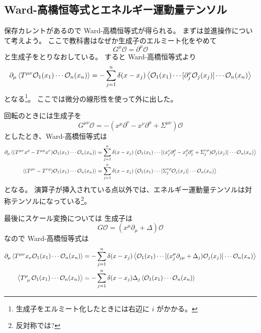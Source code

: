 \documentclass[../../master.tex]{subfiles}
\begin{document}
\subsection*{Ward-高橋恒等式とエネルギー運動量テンソル}
保存カレントがあるので Ward-高橋恒等式が得られる。
まずは並進操作について考えよう。
ここで教科書はなぜか生成子のエルミート化をやめて
\begin{equation}
    G^\mu \mathcal{O} = \partial^\mu \mathcal{O}
\end{equation}
と生成子をとりなおしている。
すると Ward-高橋恒等式より
\begin{equation}
    \partial_\mu\ev{T^{\mu\nu}\mathcal{O}_1(x_1)\cdots\mathcal{O}_n(x_n)}
    = - \sum_{j=1}^n \delta(x-x_j)\ev{\mathcal{O}_1(x_1)\cdots[\partial_j^\nu\mathcal{O}_j(x_j)]\cdots\mathcal{O}_n(x_n)}
\end{equation}
となる\footnote{生成子をエルミート化したときには右辺に \(i\) がかかる。}。
ここでは微分の線形性を使って外に出した。

回転のときには生成子を
\begin{equation}
    G^{\mu\nu}\mathcal{O} = -(x^\mu\partial^\nu-x^\nu\partial^\mu + \Sigma^{\mu\nu})\mathcal{O}
\end{equation}
としたとき、Ward-高橋恒等式は
\begin{align}
    \partial_\mu\ev{(T^{\mu\nu}x^\rho - T^{\mu\rho}x^\nu)\mathcal{O}_1(x_1)\cdots\mathcal{O}_n(x_n)}
    &= \sum_{j=1}^n \delta(x-x_j)\ev{
        \mathcal{O}_1(x_1)\cdots [
            (x_j^\nu\partial_j^\rho-x_j^\rho\partial_j^\nu + \Sigma_j^{\nu\rho})\mathcal{O}_j(x_j)
        ]\cdots\mathcal{O}_n(x_n)}\\
    \ev{(T^{\rho\nu} - T^{\nu\rho})\mathcal{O}_1(x_1)\cdots\mathcal{O}_n(x_n)}
    &= \sum_{j=1}^n \delta(x-x_j)\ev{
        \mathcal{O}_1(x_1)\cdots [
            \Sigma_j^{\nu\rho}\mathcal{O}_j(x_j)
        ]\cdots\mathcal{O}_n(x_n)}
\end{align}
となる。 %
演算子が挿入されている点以外では、エネルギー運動量テンソルは対称テンソルになっている\footnote{反対称では?}。

最後にスケール変換については
生成子は
\begin{equation}
    G\mathcal{O} = (x^\mu\partial_\mu + \Delta)\mathcal{O}
\end{equation}
なので Ward-高橋恒等式は
\begin{align}
    \partial_\mu\ev{T^{\mu\nu}x_\nu \mathcal{O}_1(x_1)\cdots\mathcal{O}_n(x_n)}
    &= - \sum_{j=1}^n \delta(x-x_j)\ev{\mathcal{O}_1(x_1)\cdots[(x_j^\mu\partial_{j\mu}+\Delta_j)\mathcal{O}_j(x_j)]\cdots\mathcal{O}_n(x_n)}\\
    \ev{T\indices{^\mu_\mu}\mathcal{O}_1(x_1)\cdots\mathcal{O}_n(x_n)}
    &= - \sum_{j=1}^n \delta(x-x_j)\Delta_j\ev{\mathcal{O}_1(x_1)\cdots\mathcal{O}_n(x_n)}
\end{align}
\end{document}
